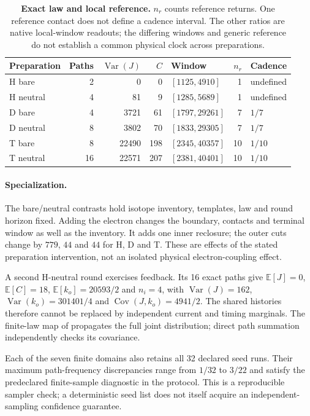\begin{table}[htbp]
\centering\small
\begin{tabular}{@{}lrrrlrl@{}}
\toprule
Preparation & Paths & $\operatorname{Var}(J)$ & $C$ & Window & $n_r$ & Cadence\\
\midrule
H bare    & 2  & 0     & 0   & $[1125,4910]$  & 1  & undefined\\
H neutral & 4  & 81    & 9   & $[1285,5689]$  & 1  & undefined\\
D bare    & 4  & 3721  & 61  & $[1797,29261]$ & 7  & $1/7$\\
D neutral & 8  & 3802  & 70  & $[1833,29305]$ & 7  & $1/7$\\
T bare    & 8  & 22490 & 198 & $[2345,40357]$ & 10 & $1/10$\\
T neutral & 16 & 22571 & 207 & $[2381,40401]$ & 10 & $1/10$\\
\bottomrule
\end{tabular}
\caption{\textbf{Exact law and local reference.} $n_r$ counts reference returns.
One reference contact does not define a cadence interval. The other ratios
are native local-window readouts; the differing windows and generic reference
do not establish a common physical clock across preparations.}
\label{tab:manual2-coupled-laws}
\end{table}

\paragraph{Specialization.}
The bare/neutral contrasts hold isotope inventory, templates, law and round
horizon fixed. Adding the electron changes the boundary, contacts and terminal
window as well as the inventory. It adds one inner reclosure; the outer cuts
change by $779$, $44$ and $44$ for H, D and T. These are effects of the stated
preparation intervention, not an isolated physical electron-coupling effect.

A second H-neutral round exercises feedback. Its 16 exact paths give
$\mathbb{E}[J]=0$, $\mathbb{E}[C]=18$,
$\mathbb{E}[k_o]=20593/2$ and $n_i=4$, with
$\operatorname{Var}(J)=162$, $\operatorname{Var}(k_o)=301401/4$ and
$\operatorname{Cov}(J,k_o)=4941/2$. The shared histories therefore cannot be
replaced by independent current and timing marginals. The finite-law map
of  propagates the full joint distribution;
direct path summation independently checks its covariance.

Each of the seven finite domains also retains all 32 declared seed runs.
Their maximum path-frequency discrepancies range from $1/32$ to $3/22$ and
satisfy the predeclared finite-sample diagnostic in the protocol. This is a
reproducible sampler check; a deterministic seed list does not itself acquire
an independent-sampling confidence guarantee.

